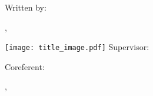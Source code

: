 \begin{titlepage}
  \centering
  {\scshape\paperinstitution\par}
  \vspace{1cm}
  {\scshape\Large\papertype\par}
  \vspace{1.5cm}
  {\huge\bfseries\papertitle\par}
  \vspace{.5cm}
  {\LARGE\bfseries\papersubtitle\par}
  \vspace{2cm}
  {\Large Written by:\par\paperauthor, \paperauthorclass}
  \vfill
  \texttt{[image: title\_image.pdf]}
  \vfill
  Supervisor:\par
  {\sc\papersupervisor\par}
  \vspace{.5cm}
  Coreferent:\par
  {\sc\papercoreferent\par}
  \vspace{1cm}
  {\large\paperdate, \paperplace\par}
\end{titlepage}
